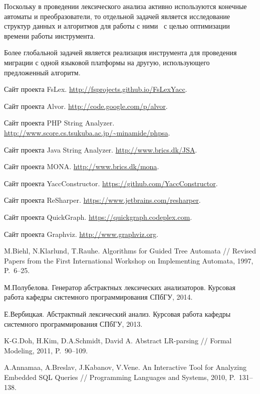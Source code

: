 Поскольку в проведении лексического анализа активно используются конечные автоматы и преобразователи, то отдельной задачей является исследование структур данных и алгоритмов для работы с ними~\cite{AlgoFSA} с целью оптимизации времени работы инструмента. 

Более глобальной задачей является реализация инструмента для проведения миграции с одной языковой платформы на другую, использующего предложенный алгоритм. 

\begin{thebibliography}{99}
    Сайт проекта FsLex. \url{http://fsprojects.github.io/FsLexYacc}.

    Сайт проекта Alvor. \url{http://code.google.com/p/alvor}.

    Сайт проекта PHP String Analyzer. \url{http://www.score.cs.tsukuba.ac.jp/~minamide/phpsa}.

    Сайт проекта Java String Analyzer. \url{http://www.brics.dk/JSA}.

    Сайт проекта MONA. \url{http://www.brics.dk/mona}.
 
    Сайт проекта YaccConstructor. \url{https://github.com/YaccConstructor}.

    Сайт проекта ReSharper. \url{https://www.jetbrains.com/resharper}.

    Сайт проекта QuickGraph. \url{https://quickgraph.codeplex.com}.

    Сайт проекта Graphviz. \url{http://www.graphviz.org}.

    M.Biehl, N.Klarlund, T.Rauhe.
    Algorithms for Guided Tree Automata // Revised Papers from the First International Workshop on Implementing Automata,
    1997, P.~6--25.

    М.Полубелова. Генератор абстрактных лексических анализаторов.
    Курсовая работа кафедры системного программирования СПбГУ, 2014.

    Е.Вербицкая. Абстрактный лексический анализ.
    Курсовая работа кафедры системного программирования СПбГУ, 2013.

 K-G.Doh, H.Kim, D.A.Schmidt, David A.
 Abstract LR-parsing // Formal Modeling, 2011, P.~90--109.

  A.Annamaa, A.Breslav, J.Kabanov, V.Vene.
  An Interactive Tool for Analyzing Embedded SQL Queries //
  Programming Languages and Systems, 2010, P.~131--138.


\end{thebibliography}

